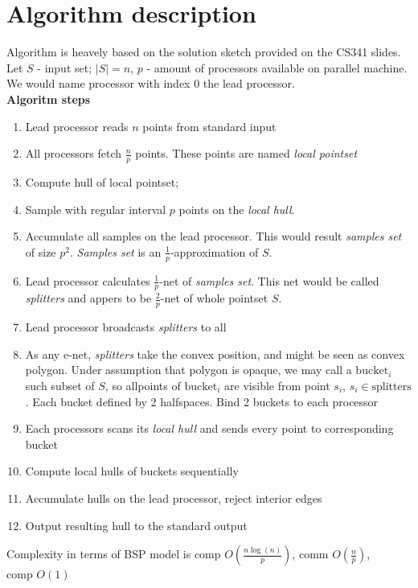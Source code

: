 \documentclass[a4paper]{article}
\begin{document}
\section {Algorithm description}
    Algorithm is heavely based on the solution sketch provided on the CS341 slides.\\
    Let $S$ - input set; $|S| = n$, $p$ - amount of processors available on parallel machine.\\
    We would name processor with index 0 the lead processor.\\
    \textbf {Algoritm steps}
    \begin {enumerate}
        \item Lead processor reads $n$ points from standard input
        \item All processors fetch $\frac n p$ points. These points are named \textit{local pointset}
        \item Compute hull of local pointset;
        \item Sample with regular interval $p$ points on the \textit{local hull}.
        \item Accumulate all samples on the lead processor. This would result \textit{samples set} of size $p^2$. \textit{Samples set} is an $\frac 1 p$-approximation of $S$.
        \item Lead processor calculates $\frac 1 p$-net of \textit{samples set}. This net would be called \textit{splitters} and appers to be $\frac 2 p$-net of whole pointset $S$.
        \item Lead processor broadcasts \textit{splitters} to all
        \item As any e-net, \textit{splitters} take the convex position, and might be seen as convex polygon. Under assumption that polygon is opaque, we may call a $\text{bucket}_i$ such subset of $S$, so allpoints of $\text{bucket}_i$ are visible from point $s_i$, $s_i \in \text{splitters}$. Each bucket defined by 2 halfspaces. Bind 2 buckets to each processor
        \item Each processors scans its \textit{local hull} and sends every point to corresponding bucket
        \item Compute local hulls of buckets sequentially
        \item Accumulate hulls on the lead processor, reject interior edges
        \item Output resulting hull to the standard output
    \end {enumerate}
    Complexity in terms of BSP model is $\text{comp }  O(\frac {n\log(n)} {p})$,
        $\text{comm }  O(\frac {n} {p})$,
        $\text{comp }  O(1)$
\end{document}
